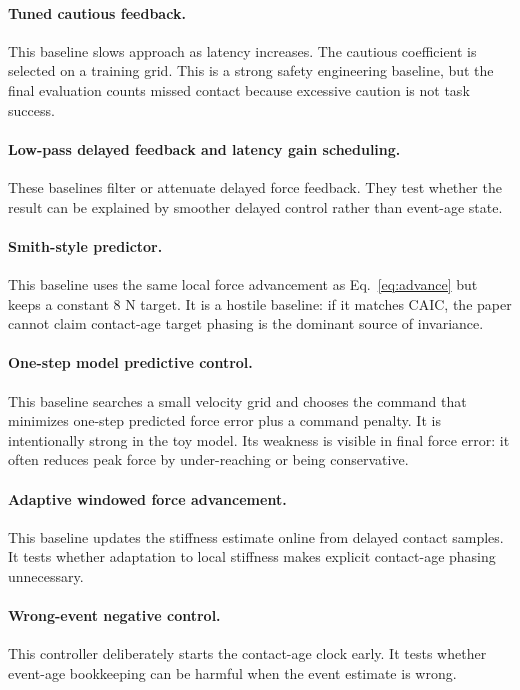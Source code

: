 \documentclass{article}
\newcommand{\caic}{CAIC}
\begin{document}
\paragraph{Tuned cautious feedback.}
This baseline slows approach as latency increases. The cautious coefficient is selected on a training grid. This is a strong safety engineering baseline, but the final evaluation counts missed contact because excessive caution is not task success.

\paragraph{Low-pass delayed feedback and latency gain scheduling.}
These baselines filter or attenuate delayed force feedback. They test whether the result can be explained by smoother delayed control rather than event-age state.

\paragraph{Smith-style predictor.}
This baseline uses the same local force advancement as Eq.~\ref{eq:advance} but keeps a constant 8 N target. It is a hostile baseline: if it matches \caic{}, the paper cannot claim contact-age target phasing is the dominant source of invariance.

\paragraph{One-step model predictive control.}
This baseline searches a small velocity grid and chooses the command that minimizes one-step predicted force error plus a command penalty. It is intentionally strong in the toy model. Its weakness is visible in final force error: it often reduces peak force by under-reaching or being conservative.

\paragraph{Adaptive windowed force advancement.}
This baseline updates the stiffness estimate online from delayed contact samples. It tests whether adaptation to local stiffness makes explicit contact-age phasing unnecessary.

\paragraph{Wrong-event negative control.}
This controller deliberately starts the contact-age clock early. It tests whether event-age bookkeeping can be harmful when the event estimate is wrong.
\end{document}
